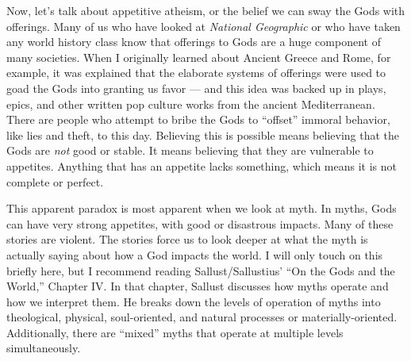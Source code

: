 \documentclass[
]{book}
\begin{document}
Now, let's talk about appetitive atheism, or the belief we can sway the Gods with offerings. Many of us who have looked at \emph{National Geographic} or who have taken any world history class know that offerings to Gods are a huge component of many societies. When I originally learned about Ancient Greece and Rome, for example, it was explained that the elaborate systems of offerings were used to goad the Gods into granting us favor --- and this idea was backed up in plays, epics, and other written pop culture works from the ancient Mediterranean. There are people who attempt to bribe the Gods to ``offset'' immoral behavior, like lies and theft, to this day. Believing this is possible means believing that the Gods are \emph{not} good or stable. It means believing that they are vulnerable to appetites. Anything that has an appetite lacks something, which means it is not complete or perfect.

This apparent paradox is most apparent when we look at myth. In myths, Gods can have very strong appetites, with good or disastrous impacts. Many of these stories are violent. The stories force us to look deeper at what the myth is actually saying about how a God impacts the world. I will only touch on this briefly here, but I recommend reading Sallust/Sallustius' ``On the Gods and the World,'' Chapter IV. In that chapter, Sallust discusses how myths operate and how we interpret them. He breaks down the levels of operation of myths into theological, physical, soul-oriented, and natural processes or materially-oriented. Additionally, there are ``mixed'' myths that operate at multiple levels simultaneously.
\end{document}
